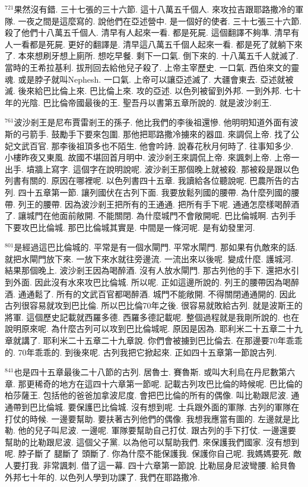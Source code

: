 \documentclass{book}
\begin{document}
$^{721}$果然沒有錯.
三十七張的三十六節.
這十八萬五千個人.
來攻拉吉跟耶路撒冷的軍隊.
一夜之間是這麼寫的.
說他們在亞述營中.
是一個好的使者.
三十七張三十六節.
殺了他們十八萬五千個人.
清早有人起來一看.
都是死屍.
這個翻譯不夠準.
清早有人一看都是死屍.
更好的翻譯是.
清早這八萬五千個人起來一看.
都是死了就躺下來了.
本來想刷牙想上廁所.
想吃早餐.
剩下一口氣.
倒下來的.
十八萬五千人就滅了.
當時的王希拉基利.
拔刑回去給他兒子殺了.
上帝主宰歷史.
一口氣.
西伯來文的靈魂.
或是脖子就叫Nephesh.
一口氣.
上帝可以讓亞述滅了.
大疆會東去.
亞述就被滅.
後來給巴比倫上來.
巴比倫上來.
攻的亞述.
以色列被留到外邦.
一到外邦.
七十年的光陰.
巴比倫帝國最後的王.
聖吾丹以書第五章所說的.
就是波沙剎王.

$^{761}$波沙剎王是尼布賈雷剎王的孫子.
他比我們的李後祖還慘.
他明明知道外面有波斯的弓箭手.
鼓勵手下要來包圍.
那他把耶路撒冷擄來的器皿.
來調侃上帝.
找了公妃文武百官.
那李後祖頂多也不陌生.
他會吟詩.
說春花秋月何時了.
往事知多少.
小樓昨夜又東風.
故國不堪回首月明中.
波沙剎王來調侃上帝.
來諷刺上帝.
上帝一出手.
墳牆上寫字.
這個字在說明說呢.
波沙剎王那個晚上就被殺.
那被殺是跟以色列書有關的.
原因在哪裡呢.
以色列書四十五章.
我讀給各位聽說呢.
巴農所告的古列.
四十五章第一節.
讓列國伏在古列下面.
我要放鬆列國的腰帶.
為什麼列國的腰帶.
列王的腰帶.
因為波沙剎王把所有的王通通.
把所有手下呢.
通通怎麼樣喝醉酒了.
讓城門在他面前敞開.
不能關閉.
為什麼城門不會敞開呢.
巴比倫城啊.
古列手下要攻巴比倫城.
那巴比倫城其實是.
中間是一條河呢.
是有幼發里河.

$^{801}$是經過這巴比倫城的.
平常是有一個水閘門.
平常水閘門.
那如果有仇敵來的話.
就把水閘門放下來.
一放下來水就往旁邊流.
一流出來以後呢.
變成什麼.
護城河.
結果那個晚上.
波沙剎王因為喝醉酒.
沒有人放水閘門.
那古列他的手下.
還把水引到外面.
因此沒有水來攻巴比倫城.
所以呢.
正如這邊所說的.
列王的腰帶因為喝醉酒.
通通鬆了.
所有的文武百官都喝醉酒.
城門不能敞開.
不得關閉通通開的.
因此古列很容易就攻到巴比倫.
所以巴比倫70年之後.
很容易就敗給古列.
就是波斯王的將軍.
這個歷史記載就西羅多德.
西羅多德記載呢.
整個過程就是我剛所說的.
也在說明原來呢.
為什麼古列可以攻到巴比倫城呢.
原因是因為.
耶利米二十五章二十九章就講了.
耶利米二十五章二十九章說.
你們會被擄到巴比倫去.
在那邊要70年乖乖的.
70年乖乖的.
到後來呢.
古列我把它掀起來.
正如四十五章第一節說古列.

$^{841}$也是四十五章最後二十八節的古列.
居魯士.
賽魯斯.
或叫大利烏在丹尼數第六章.
那更稀奇的地方在這四十六章第一節呢.
記載古列攻巴比倫的時候呢.
巴比倫的柏莎薩王.
包括他的爸爸加拿波尼度.
會把巴比倫的所有的偶像.
叫比勒跟尼波.
通通帶到巴比倫城.
要保護巴比倫城.
沒有想到呢.
士兵跟外面的軍隊.
古列的軍隊在打仗的時候.
一邊要幫助.
要扶著古列他們的偶像.
我想我應當有圖的.
左邊就是比勒.
他的兒子叫尼波.
一邊呢.
軍隊要幫助自己打仗.
跟古列的手下打仗.
一邊還要幫助的比勒跟尼波.
這個父子黨.
以為他可以幫助我們.
來保護我們國家.
沒有想到呢.
脖子斷了 腿斷了 頭斷了.
你為什麼不能保護我.
保護你自己呢.
我媽媽要死.
敵人要打我.
非常諷刺.
借了這一幕.
四十六章第一節說.
比勒屈身尼波彎腰.
給貝魯外邦七十年的.
以色列人學到功課了.
我們在耶路撒冷.
\end{document}
